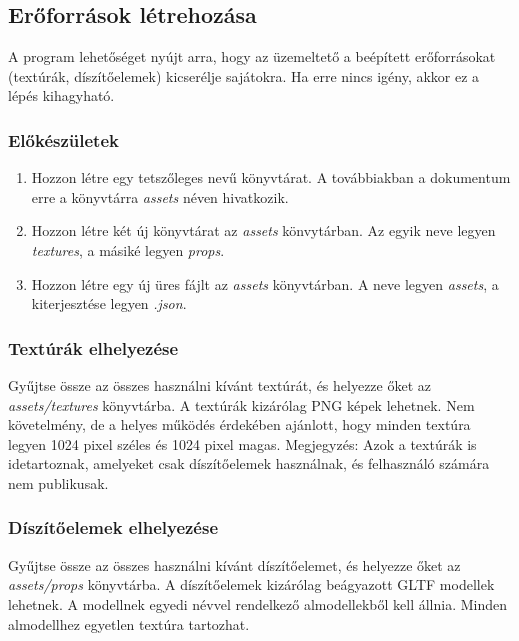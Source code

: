 \subsection{Erőforrások létrehozása}

A program lehetőséget nyújt arra, hogy az üzemeltető a beépített erőforrásokat
(textúrák, díszítőelemek) kicserélje sajátokra. Ha erre nincs igény, akkor ez a lépés kihagyható.

\subsubsection{Előkészületek}

\begin{enumerate}
    \item Hozzon létre egy tetszőleges nevű könyvtárat. A továbbiakban a dokumentum erre a
          könyvtárra \emph{assets} néven hivatkozik.

    \item Hozzon létre két új könyvtárat az \emph{assets} könvytárban. Az egyik neve legyen
          \emph{textures}, a másiké legyen \emph{props}.

    \item Hozzon létre egy új üres fájlt az \emph{assets} könyvtárban. A neve legyen \emph{assets},
          a kiterjesztése legyen \emph{.json}.
\end{enumerate}

\subsubsection{Textúrák elhelyezése}

Gyűjtse össze az összes használni kívánt textúrát, és helyezze őket az \emph{assets/textures}
könyvtárba. A textúrák kizárólag PNG képek lehetnek. Nem követelmény, de a helyes működés érdekében
ajánlott, hogy minden textúra legyen 1024 pixel széles és 1024 pixel magas. Megjegyzés: Azok a
textúrák is idetartoznak, amelyeket csak díszítőelemek használnak, és felhasználó számára nem
publikusak.

\subsubsection{Díszítőelemek elhelyezése}

Gyűjtse össze az összes használni kívánt díszítőelemet, és helyezze őket az \emph{assets/props}
könyvtárba. A díszítőelemek kizárólag beágyazott GLTF modellek lehetnek. A modellnek egyedi
névvel rendelkező almodellekből kell állnia. Minden almodellhez egyetlen textúra tartozhat.

